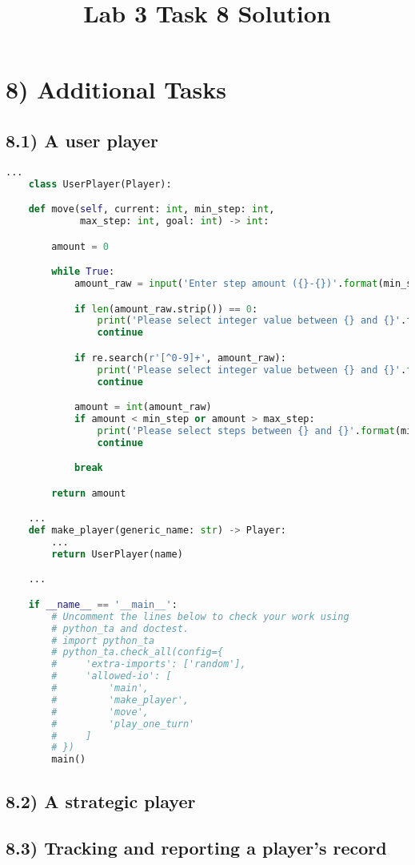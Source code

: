 \documentclass[12pt]{article}
\begin{document}
\title{Lab 3 Task 8 Solution}
\date{}
\maketitle

\section*{8) Additional Tasks}

\subsection*{8.1) A user player}

\begin{lstlisting}[language=Python]
    ...
    class UserPlayer(Player):

    def move(self, current: int, min_step: int,
             max_step: int, goal: int) -> int:

        amount = 0

        while True:
            amount_raw = input('Enter step amount ({}-{})'.format(min_step, max_step))

            if len(amount_raw.strip()) == 0:
                print('Please select integer value between {} and {}'.format(min_step, max_step))
                continue

            if re.search(r'[^0-9]+', amount_raw):
                print('Please select integer value between {} and {}'.format(min_step, max_step))
                continue

            amount = int(amount_raw)
            if amount < min_step or amount > max_step:
                print('Please select steps between {} and {}'.format(min_step, max_step))
                continue

            break

        return amount

    ...
    def make_player(generic_name: str) -> Player:
        ...
        return UserPlayer(name)

    ...

    if __name__ == '__main__':
        # Uncomment the lines below to check your work using
        # python_ta and doctest.
        # import python_ta
        # python_ta.check_all(config={
        #     'extra-imports': ['random'],
        #     'allowed-io': [
        #         'main',
        #         'make_player',
        #         'move',
        #         'play_one_turn'
        #     ]
        # })
        main()
\end{lstlisting}

\subsection*{8.2) A strategic player}

\subsection*{8.3) Tracking and reporting a player’s record}
\end{document}
